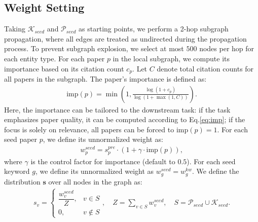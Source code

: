 \documentclass{llmxive}
\begin{document}
\subsection{Weight Setting}
Taking $\mathcal{K}_{seed}$ and $\mathcal{P}_{seed}$ as starting points, we perform a 2-hop subgraph propagation, where all edges are treated as undirected during the propagation process.
To prevent subgraph explosion, we select at most $500$ nodes per hop for each entity type.
For each paper $p$ in the local subgraph, we compute its importance based on its citation count $c_p$.
Let $C$ denote total citation counts for all papers in the subgraph.
The paper's importance is defined as:
\begin{align}
\label{eq:imp}
    \text{imp}(p)=\min\left(1,\frac{\log(1+c_p)}{\log(1+\max(1,C))}\right).
\end{align}
Here, the importance can be tailored to the downstream task: if the task emphasizes paper quality, it can be computed according to Eq.\ref{eq:imp}; if the focus is solely on relevance, all papers can be forced to $\text{imp}(p)=1$.
For each seed paper $p$, we define its unnormalized weight as:
\begin{align}
\label{eq:wp}
    w_p^{seed}=s_p^{pre}\cdot(1+\gamma\cdot \text{imp}(p)),
\end{align}
where $\gamma$ is the control factor for importance (default to $0.5$).
For each seed keyword $g$, we define its unnormalized weight as $w_g^{seed} = w_g^{kw}$.
We define the distribution $\mathbf{s}$ over all nodes in the graph as:
\begin{align}
    s_v =
\begin{cases}
\dfrac{w_v^{seed}}{Z}, & v \in S \\
0, & v \notin S
\end{cases},\quad Z = \sum_{v \in S} w_v^{seed},\quad S = \mathcal{P}_{seed} \cup \mathcal{K}_{seed}.
\end{align}
\end{document}
